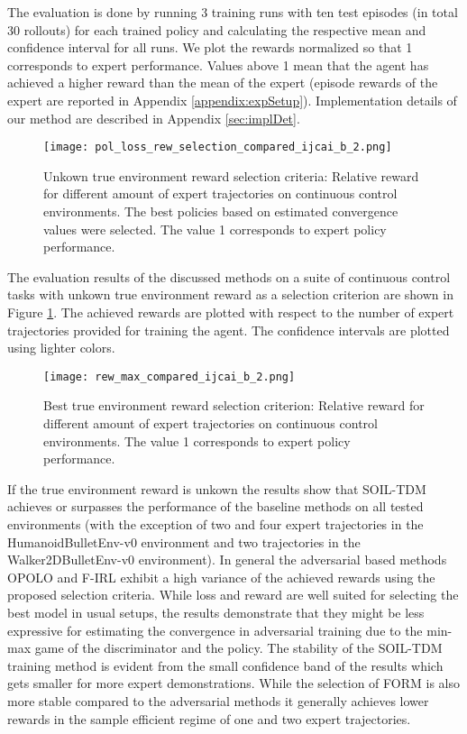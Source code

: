\documentclass{article}
\begin{document}
The evaluation is done by running 3 training runs with ten test episodes (in total 30 rollouts) for each trained policy and calculating the respective mean and confidence interval for all runs. We plot the rewards normalized so that 1 corresponds to expert performance. Values above 1 mean that the agent has achieved a higher reward than the mean of the expert (episode rewards of the expert are reported in Appendix \ref{appendix:expSetup}). Implementation details of our method are described in Appendix \ref{sec:implDet}. 


\begin{figure}[t]
\begin{center}
\texttt{[image: pol\_loss\_rew\_selection\_compared\_ijcai\_b\_2.png]}
\end{center}
\caption{Unkown true environment reward selection criteria: Relative reward for different amount of expert trajectories on continuous control environments. The best policies based on estimated convergence values were selected. The value 1 corresponds to expert policy performance.}
\label{fig:reward_plot}
\end{figure} 


The evaluation results of the discussed methods on a suite of continuous control tasks with unkown true environment reward as a selection criterion are shown in Figure \ref{fig:reward_plot}. The achieved rewards are plotted with respect to the number of expert trajectories provided for training the agent. The confidence intervals are plotted using lighter colors. 

\begin{figure}[t]
\begin{center}
\texttt{[image: rew\_max\_compared\_ijcai\_b\_2.png]}
\end{center}
\caption{Best true environment reward selection criterion: Relative reward for different amount of expert trajectories on continuous control environments. The value 1 corresponds to expert policy performance.}
\label{fig:reward_max_plot}
\end{figure}

If the true environment reward is unkown the results show that SOIL-TDM achieves or surpasses the performance of the baseline methods on all tested environments (with the exception of two and four expert trajectories in the HumanoidBulletEnv-v0 environment and two trajectories in the Walker2DBulletEnv-v0 environment). In general the adversarial based methods OPOLO and F-IRL exhibit a high variance of the achieved rewards using the proposed selection criteria. While loss and reward are well suited for selecting the best model in usual setups, the results demonstrate that they might be less expressive for estimating the convergence in adversarial training due to the min-max game of the discriminator and the policy. The stability of the SOIL-TDM training method is evident from the small confidence band of the results which gets smaller for more expert demonstrations. While the selection of FORM is also more stable compared to the adversarial methods it generally achieves lower rewards in the sample efficient regime of one and two expert trajectories. 
\end{document}
